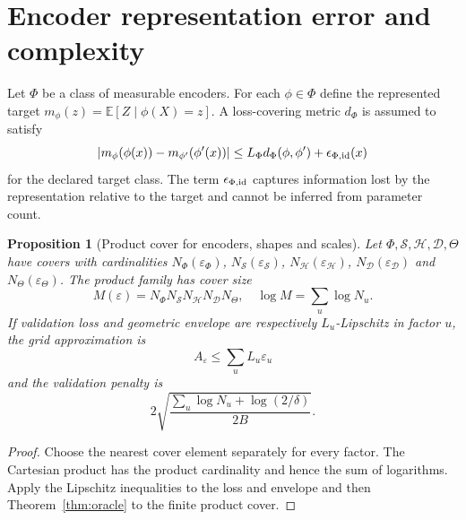 \documentclass[11pt,a4paper]{article}
\newcommand{\E}{\mathbb E}\newcommand{\Pp}{\mathbb P}
\numberwithin{equation}{section}
\newtheorem{proposition}[theorem]{Proposition}
\theoremstyle{definition}\newtheorem{definition}[theorem]{Definition}
\theoremstyle{remark}\newtheorem{remark}[theorem]{Remark}
\begin{document}
\section{Encoder representation error and complexity}\label{sec:encoder}
Let $\Phi$ be a class of measurable encoders. For each $\phi\in\Phi$ define the represented target $m_\phi(z)=\E[Z\mid\phi(X)=z]$. A loss-covering metric $d_\Phi$ is assumed to satisfy
\[
 |m_\phi(\phi(x))-m_{\phi'}(\phi'(x))|
 \le L_\Phi d_\Phi(\phi,\phi')+\epsilon_{\Phi,\rm id}(x)
\]
for the declared target class. The term $\epsilon_{\Phi,\rm id}$ captures information lost by the representation relative to the target and cannot be inferred from parameter count.

\begin{proposition}[Product cover for encoders, shapes and scales]\label{prop:cover}
Let $\Phi,\mathcal S,\mathcal H,\mathcal D,\Theta$ have covers with cardinalities
$N_\Phi(\varepsilon_\Phi)$, $N_\mathcal S(\varepsilon_\mathcal S)$,
$N_\mathcal H(\varepsilon_\mathcal H)$, $N_\mathcal D(\varepsilon_\mathcal D)$ and
$N_\Theta(\varepsilon_\Theta)$. The product family has cover size
\[
 M(\varepsilon)=N_\Phi N_\mathcal S N_\mathcal H N_\mathcal D N_\Theta,
\quad
 \log M=\sum_u\log N_u.
\]
If validation loss and geometric envelope are respectively $L_u$-Lipschitz in factor $u$, the grid approximation is
\[
 A_\varepsilon\le\sum_u L_u\varepsilon_u
\]
and the validation penalty is
\[
 2\sqrt{\frac{\sum_u\log N_u+\log(2/\delta)}{2B}}.
\]
\end{proposition}
\begin{proof}
Choose the nearest cover element separately for every factor. The Cartesian product has the product cardinality and hence the sum of logarithms. Apply the Lipschitz inequalities to the loss and envelope and then Theorem~\ref{thm:oracle} to the finite product cover.
\end{proof}
\end{document}
